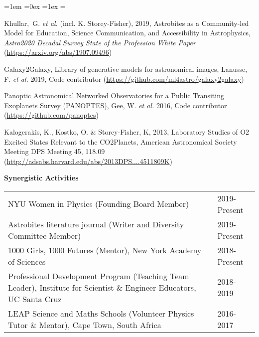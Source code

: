 \documentclass[12pt]{article}
\newcommand{\head}[1]{\vspace{1cm}\textbf{#1}\vspace{0.2cm}\\}
\newcommand{\foreign}[1]{\textsl{#1}}
\newcommand{\ksflist}{%
  \rightmargin=0in
  \leftmargin=1em
  \topsep=0ex
  \partopsep=0pt
  \itemsep=1ex
  \parsep=0pt
  \itemindent=-1.0\leftmargin
  \listparindent=\leftmargin
  \settowidth{\labelsep}{~}
  \usecounter{enumi}
}
\begin{document}
\begin{list}{}{\ksflist}

\item
Khullar,~G. \textit{et al.} (incl. K. Storey-Fisher), 2019, Astrobites as a Community-led Model for Education, Science Communication, and Accessibility in Astrophysics, \textit{Astro2020 Decadal Survey State of the Profession White Paper} (\href{https://arxiv.org/abs/1907.09496}{https://arxiv.org/abs/1907.09496})\\
\item
Galaxy2Galaxy, Library of generative models for astronomical images, Lanusse, F. \foreign{et al.} 2019, Code contributor (\href{https://github.com/ml4astro/galaxy2galaxy}{https://github.com/ml4astro/galaxy2galaxy}) \\
\item
Panoptic Astronomical Networked Observatories for a Public Transiting Exoplanets Survey (PANOPTES), Gee, W. \foreign{et al.} 2016, Code contributor (\href{https://github.com/panoptes}{https://github.com/panoptes}) \\
\item
Kalogerakis, K., Kostko, O. \& Storey-Fisher, K, 2013, Laboratory Studies of O2 Excited States Relevant to the CO2Planets, American Astronomical Society Meeting DPS Meeting 45, 118.09 (\href{http://adsabs.harvard.edu/abs/2013DPS....4511809K}{http://adsabs.harvard.edu/abs/2013DPS....4511809K})  \\ 

\end{list}

\newpage
\head{Synergistic Activities}

{\renewcommand{\arraystretch}{1.5}
\hspace{-0.3cm}\begin{tabularx}{\textwidth}{ht} 

NYU Women in Physics (Founding Board Member) & 2019-Present \\

Astrobites literature journal (Writer and Diversity Committee Member) & 2019-Present \\

1000 Girls, 1000 Futures (Mentor), New York Academy of Sciences & 2018-Present \\

Professional Development Program (Teaching Team Leader), Institute for Scientist \& Engineer Educators, UC Santa Cruz & 2018-2019 \\  

LEAP Science and Maths Schools (Volunteer Physics Tutor \& Mentor), Cape Town, South Africa & 2016-2017 \\

\end{tabularx}
}
\end{document}
